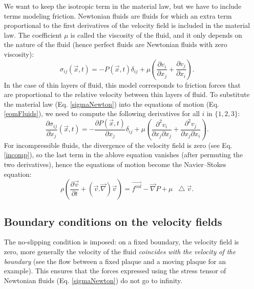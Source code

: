 \documentclass[DIV=12]{article}
\newcommand*\Laplace{\mathop{}\!\mathbin\bigtriangleup}
\newcommand{\fVol}{\vec{f^{vol}}}
\begin{document}
 We want to keep the isotropic term in the material law, but we have 
 to include terms modeling friction.
 Newtonian fluids are fluids for which an extra term proportional to the first derivatives
 of the velocity field is included in the material law. The coefficient $\mu$ is called the 
 viscosity of the fluid, and it only depends on the nature of the fluid
  (hence perfect fluids are Newtonian fluids with zero viscosity):
\begin{equation}\boxed{
\sigma_{ij}( \vec{x}, t ) = -P(\vec{x}, t ) \delta_{ij}+ \mu\left( \frac{\partial v_i}{\partial x_j} + \frac{\partial v_j}{\partial x_i}\right).}
 \label{sigmaNewton}
\end{equation}
 In the case of thin layers of fluid, this model corresponds to friction forces that are proportional to the relative velocity 
 between thin layers of fluid. To substitute the material law (Eq. \ref{sigmaNewton}) into the equations of motion (Eq. \ref{eomFluids}), we need to compute the following derivatives for all $i$ in $\{  1,2,3\}$:
\begin{equation}
\frac{\partial\sigma_{ij}}{\partial x_j}( \vec{x}, t ) = -\frac{\partial P(\vec{x}, t )}{\partial x_j} \delta_{ij}+ \mu\left( \frac{\partial^2 v_i}{\partial x_j\partial x_j} + \frac{\partial^2 v_j}{\partial x_j\partial x_i}\right).
\end{equation}
 For incompressible fluids, the divergence of the velocity field is zero (see Eq. \ref{incomp}), so the last term in the ablove equation vanishes (after
 permuting the two derivatives), hence the 
 equations of motion become the Navier--Stokes equation:
 \begin{equation}
\boxed{
\rho\left( \frac{\partial \vec{v}}{\partial t} + ( \vec{v}.\vec{\nabla}) \vec{v}\right)= \fVol - \vec{\nabla} P + \mu \Laplace \vec{v}.
\label{NS}}
 \end{equation}

 \subsection{Boundary conditions on the velocity fields}
 The no-slipping condition is imposed: on a fixed boundary, the velocity field is zero, more 
generally the velocity of the fluid {\emph{coincides with the velocity of the boundary}} (see the 
 flow between a fixed plaque and a moving plaque for an example). This ensures that the forces 
 expressed using the stress tensor of Newtonian fluids (Eq. \ref{sigmaNewton}) do not go to infinity.








 
\end{document}
